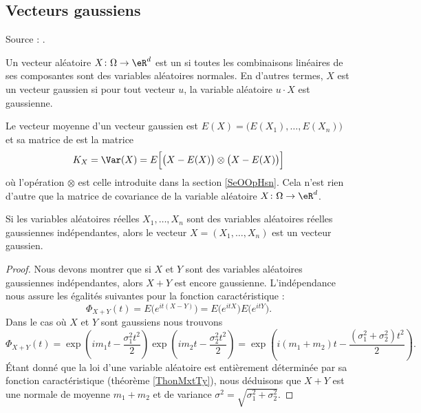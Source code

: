 \subsection{Vecteurs gaussiens}

Source : \cite{ProbaDanielLi,GaussienYoann}.

\begin{definition}
    Un vecteur aléatoire \( X\colon \Omega\to \eR^d\) est un  si toutes les combinaisons linéaires de ses composantes sont des variables aléatoires normales. En d'autres termes, \( X\) est un vecteur gaussien si pour tout vecteur \( u\), la variable aléatoire \( u\cdot X\) est gaussienne.
\end{definition}

Le vecteur moyenne d'un vecteur gaussien est \( E(X)=\big( E(X_1),\ldots, E(X_n) \big)\) et sa matrice de  est la matrice
\begin{equation}
    K_X=\Var(X)=E\Big[ \big( X-E(X) \big)\otimes \big( X-E(X) \big) \Big]
\end{equation}
où l'opération \( \otimes\) est celle introduite dans la section \ref{SeOOpHsn}. Cela n'est rien d'autre que la matrice de covariance de la variable aléatoire \( X\colon \Omega\to \eR^d\).

\begin{lemma}
    Si les variables aléatoires réelles \( X_1,\ldots, X_n\) sont des variables aléatoires réelles gaussiennes indépendantes, alors le vecteur \( X=(X_1,\ldots, X_n)\) est un vecteur gaussien.
\end{lemma}

\begin{proof}
    Nous devons montrer que si \( X\) et \( Y\) sont des variables aléatoires gaussiennes indépendantes, alors \( X+Y\) est encore gaussienne. L'indépendance nous assure les égalités suivantes pour la fonction caractéristique :
    \begin{equation}
        \Phi_{X+Y}(t)=E\big(  e^{it(X-Y)} \big)=E\big(  e^{itX} \big)E\big(  e^{itY} \big).
    \end{equation}
    Dans le cas où \( X\) et \( Y\) sont gaussiens nous trouvons
    \begin{equation}
        \Phi_{X+Y}(t)=\exp\left( im_1t-\frac{ \sigma_1^2t^2 }{2} \right)\exp\left( im_2t-\frac{ \sigma_2^2t^2 }{2} \right)=\exp\left( i(m_1+m_2)t-\frac{ (\sigma_1^2+\sigma_2^2)t^2 }{2} \right).
    \end{equation}
    Étant donné que la loi d'une variable aléatoire est entièrement déterminée par sa fonction caractéristique (théorème \ref{ThonMxtTy}), nous déduisons que \( X+Y\) est une normale de moyenne \( m_1+m_2\) et de variance \( \sigma^2=\sqrt{\sigma_1^2+\sigma_2^2}\).
\end{proof}

